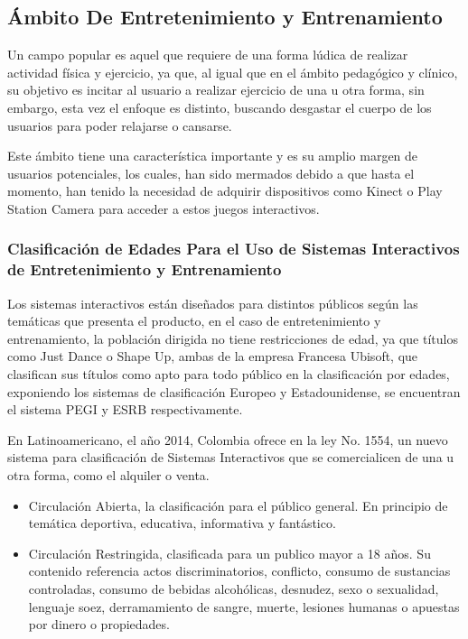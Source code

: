 \subsection{Ámbito De Entretenimiento y Entrenamiento}

Un campo popular es aquel que requiere de una forma lúdica de realizar actividad física y ejercicio, ya que, al igual que en el ámbito pedagógico y clínico, su objetivo es incitar al usuario a realizar ejercicio de una u otra forma, sin embargo, esta vez el enfoque es distinto, buscando desgastar el cuerpo de los usuarios para poder relajarse o cansarse.

Este ámbito tiene una característica importante y es su amplio margen de usuarios potenciales, los cuales, han sido mermados debido a que hasta el momento, han tenido la necesidad de adquirir dispositivos como Kinect o Play Station Camera para acceder a estos juegos interactivos.

\subsubsection{Clasificación de Edades Para el Uso de Sistemas Interactivos de Entretenimiento y Entrenamiento}

Los sistemas interactivos están diseñados para distintos públicos según las temáticas que presenta el producto, en el caso de entretenimiento y entrenamiento, la población dirigida no tiene restricciones de edad, ya que títulos como Just Dance o Shape Up, ambas de la empresa Francesa Ubisoft, que clasifican sus títulos como apto para todo público en la clasificación por edades, exponiendo los sistemas de clasificación Europeo y Estadounidense, se encuentran el sistema PEGI y ESRB respectivamente.

En Latinoamericano, el año 2014, Colombia ofrece en la ley No. 1554, un nuevo sistema para clasificación de Sistemas Interactivos que se comercialicen de una u otra forma, como el alquiler o venta.
\begin{itemize}
	\item Circulación Abierta, la clasificación para el público general. En principio de temática deportiva, educativa, informativa y fantástico.
	\item Circulación Restringida, clasificada para un publico mayor a 18 años. Su contenido referencia actos discriminatorios, conflicto, consumo de sustancias controladas, consumo de bebidas alcohólicas, desnudez, sexo o sexualidad, lenguaje soez, derramamiento de sangre, muerte, lesiones humanas o apuestas por dinero o propiedades.
\end{itemize}

